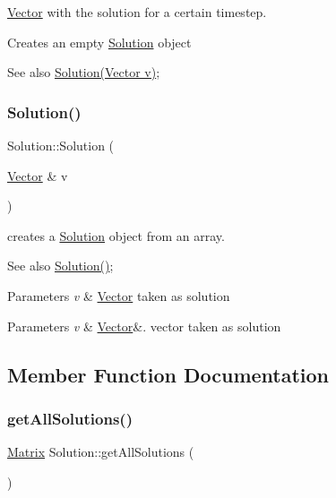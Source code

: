 \hyperlink{class_vector}{Vector} with the solution for a certain timestep. 

Creates an empty \hyperlink{class_solution}{Solution} object \begin{DoxySeeAlso}{See also}
\hyperlink{class_solution}{Solution(\+Vector v)}; 
\end{DoxySeeAlso}
\mbox{\label{class_solution_ad2732696d61865b9ec2f4ce9bd00c607}} 
\subsubsection{\texorpdfstring{Solution()}{Solution()}\hspace{0.1cm}{\footnotesize\ttfamily [2/2]}}
{\footnotesize\ttfamily Solution\+::\+Solution (\begin{DoxyParamCaption}\item[{\hyperlink{class_vector}{Vector} \&}]{v }\end{DoxyParamCaption})}

creates a \hyperlink{class_solution}{Solution} object from an array. \begin{DoxySeeAlso}{See also}
\hyperlink{class_solution_ab55bd4b023d596ce11aaf737b9a6123b}{Solution()}; 
\end{DoxySeeAlso}

\begin{DoxyParams}{Parameters}
{\em v} & \hyperlink{class_vector}{Vector} taken as solution \\
\hline
\end{DoxyParams}

\begin{DoxyParams}{Parameters}
{\em v} & \hyperlink{class_vector}{Vector}\&. vector taken as solution \\
\hline
\end{DoxyParams}


\subsection{Member Function Documentation}
\mbox{\label{class_solution_a6e44ed377115a0f5168eab5e844009bc}} 
\subsubsection{\texorpdfstring{get\+All\+Solutions()}{getAllSolutions()}}
{\footnotesize\ttfamily \hyperlink{class_matrix}{Matrix} Solution\+::get\+All\+Solutions (\begin{DoxyParamCaption}{ }\end{DoxyParamCaption})}

